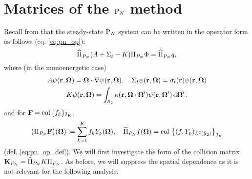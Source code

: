 \chapter{Matrices of the $\PN$ method}\label{app:C}
Recall from  that the steady-state $\PN$ system can be written in the operator form as follows (eq.
\eqref{eq:pn_op}):
\begin{equation}\label{eq:PN_ss_app}
	\PihPN (A+\Sigma_t-K) \PiPN\Phi = \PihPN q,
\end{equation}
where (in the monoenergetic case) 
$$
\begin{gathered}
A\psi(\br,\bomega) = \bomega\cdot\nabla\psi(\br,\bomega),\quad
\Sigma_t\psi(\br,\bomega) = \sigma_t(\br)\psi(\br,\bomega)\\
K\psi(\br,\bomega) = \intA[']{\kappa(\br,\bomega\cdot\bomega')\psi(\br,\bomega')}.
\end{gathered}         
$$
and for $\mat{F} = \col \{f_k\}_{\idxset{K}}$,
\begin{equation}\label{eq:pn_op_def_app}
\bigl(\PiPN\mat{F}\bigr)(\bomega) := \sum_{k=1}^{ K} f_k\Y{k}{}(\bomega), \quad
\PihPN f(\bomega) = \col \left\{(f, \Y{k}{})_{\Lp[2](\Sphere)}\right\}_{\idxset{K}}
\end{equation}
(def. \eqref{eq:pn_op_def}). We will first investigate the form of the collision matrix $\mat{K}_{P_N} = \PihPN K
\PiPN$. As before, we will suppress the spatial dependence as it is not relevant for the following analysis.

